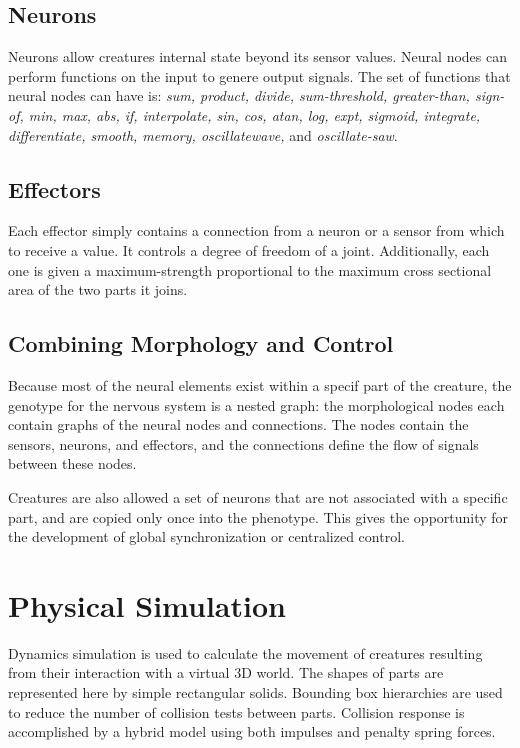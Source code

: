 \documentclass[../main.tex]{subfiles}
\begin{document}
\subsection{Neurons}

Neurons allow creatures internal state beyond its sensor values. Neural nodes can perform functions on the input to
genere output signals. The set of functions that neural nodes can have is: \emph{ sum, product, divide, sum-threshold,
greater-than, sign-of, min, max, abs, if, interpolate, sin, cos, atan, log, expt, sigmoid, integrate, differentiate,
smooth, memory, oscillatewave,} and \emph{oscillate-saw}.

\subsection{Effectors}
Each effector simply contains a connection from a neuron or a sensor from which to receive a value. It
controls a degree of freedom of a joint. Additionally, each one is given a maximum-strength proportional to the maximum
cross sectional area of the two parts it joins.

\subsection{Combining Morphology and Control}

Because most of the neural elements exist within a specif part of the creature, the genotype for the nervous system is
a nested graph: the morphological nodes each contain graphs of the neural nodes and connections. The nodes contain the
sensors, neurons, and effectors, and the connections define the flow of signals between these nodes.

Creatures are also allowed a set of neurons that are not associated with a specific part, and are copied only once into
the phenotype. This gives the opportunity for the development of global synchronization or centralized control.

\section{Physical Simulation}
Dynamics simulation is used to calculate the movement of creatures resulting from their interaction with a virtual 3D
world. The shapes of parts are represented here by simple rectangular solids.  Bounding box hierarchies are used to
reduce the number of collision tests between parts. Collision response is accomplished by a hybrid model using both
impulses and penalty spring forces.
\end{document}
